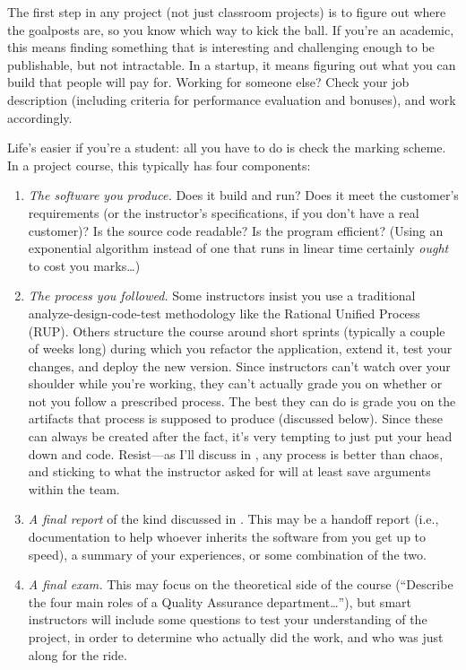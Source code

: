 \documentclass{report}
\begin{document}
The first step in any project (not just classroom projects) is to
figure out where the goalposts are, so you know which way to kick the
ball.  If you're an academic, this means finding something that is
interesting and challenging enough to be publishable, but not
intractable.  In a startup, it means figuring out what you can build
that people will pay for.  Working for someone else?  Check your job
description (including criteria for performance evaluation and
bonuses), and work accordingly.

Life's easier if you're a student: all you have to do is check
the marking scheme.  In a project course, this typically has four
components:

\begin{enumerate}

  \item \emph{The software you produce.}  Does it build and run?  Does
  it meet the customer's requirements (or the instructor's
  specifications, if you don't have a real customer)?  Is the source
  code readable?  Is the program efficient?  (Using an exponential
  algorithm instead of one that runs in linear time certainly
  \emph{ought} to cost you marks{\ldots})

  \item \emph{The process you followed.}  Some instructors insist you
  use a traditional analyze-design-code-test methodology like the
  Rational Unified Process (RUP).  Others structure the course around
  short sprints (typically a couple of weeks long) during which you
  refactor the application, extend it, test your changes, and deploy
  the new version.  Since instructors can't watch over your shoulder
  while you're working, they can't actually grade you on whether or
  not you follow a prescribed process.  The best they can do is grade
  you on the artifacts that process is supposed to produce (discussed
  below).  Since these can always be created after the fact, it's very
  tempting to just put your head down and code.  Resist---as I'll
  discuss in , any process is better than chaos,
  and sticking to what the instructor asked for will at least save
  arguments within the team.

  \item \emph{A final report} of the kind discussed in
  .  This may be a handoff report (i.e.,
  documentation to help whoever inherits the software from you get up
  to speed), a summary of your experiences, or some combination of the
  two.

  \item \emph{A final exam.}  This may focus on the theoretical side
  of the course (``Describe the four main roles of a Quality Assurance
  department{\ldots}''), but smart instructors will include some
  questions to test your understanding of the project, in order to
  determine who actually did the work, and who was just along for the
  ride.

\end{enumerate}
\end{document}
